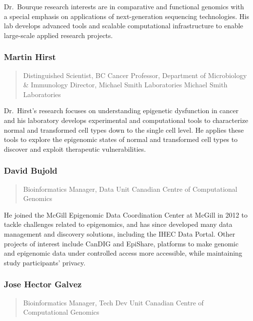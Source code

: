 \documentclass[
]{book}
\begin{document}
Dr.~Bourque research interests are in comparative and functional
genomics with a special emphasis on applications of next-generation sequencing technologies.
His lab develops advanced tools and scalable computational infrastructure to enable large-scale
applied research projects.

\subsubsection{Martin Hirst}\label{martin-hirst}

\begin{quote}
Distinguished Scientist, BC Cancer
Professor, Department of Microbiology \& Immunology
Director, Michael Smith Laboratories
Michael Smith Laboratories
\end{quote}

Dr.~Hirst's research focuses on understanding epigenetic dysfunction in
cancer and his laboratory develops experimental and computational tools to characterize normal
and transformed cell types down to the single cell level. He applies these tools to explore the
epigenomic states of normal and transformed cell types to discover and exploit therapeutic
vulnerabilities.

\subsubsection{David Bujold}\label{david-bujold}

\begin{quote}
Bioinformatics Manager, Data Unit
Canadian Centre of Computational Genomics
\end{quote}

He joined the McGill Epigenomic Data Coordination Center at McGill in
2012 to tackle challenges related to epigenomics, and has since developed
many data management and discovery solutions, including the IHEC Data Portal. Other projects
of interest include CanDIG and EpiShare, platforms to make genomic and epigenomic data
under controlled access more accessible, while maintaining study participants' privacy.

\subsubsection{Jose Hector Galvez}\label{jose-hector-galvez}

\begin{quote}
Bioinformatics Manager, Tech Dev Unit
Canadian Centre of Computational Genomics
\end{quote}
\end{document}
